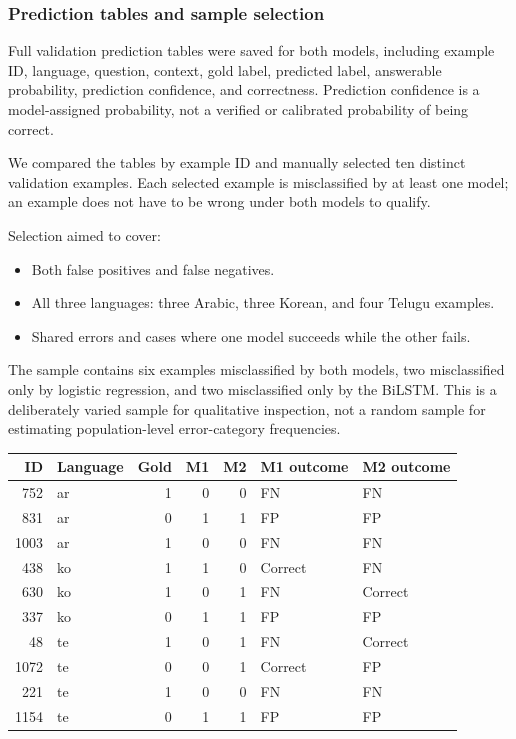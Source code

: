 \documentclass[11pt,a4paper]{article}
\begin{document}
\subsubsection{Prediction tables and sample selection}

Full validation prediction tables were saved for both models,
including example ID, language, question, context, gold label,
predicted label, answerable probability, prediction confidence, and
correctness. Prediction confidence is a model-assigned probability,
not a verified or calibrated probability of being correct.

We compared the tables by example ID and manually selected ten distinct
validation examples. Each selected example is misclassified by at
least one model; an example does not have to be wrong under both
models to qualify.

Selection aimed to cover:
\begin{itemize}
    \item Both false positives and false negatives.
    \item All three languages: three Arabic, three Korean, and four
    Telugu examples.
    \item Shared errors and cases where one model succeeds while
    the other fails.
\end{itemize}

The sample contains six examples misclassified by both models, two
misclassified only by logistic regression, and two misclassified only
by the BiLSTM. This is a deliberately varied sample for qualitative
inspection, not a random sample for estimating population-level
error-category frequencies.

\begin{center}
\small
\begin{tabular}{rlrrrll}
\toprule
ID & Language & Gold & M1 & M2 & M1 outcome & M2 outcome \\
\midrule
752  & ar & 1 & 0 & 0 & FN      & FN \\
831  & ar & 0 & 1 & 1 & FP      & FP \\
1003 & ar & 1 & 0 & 0 & FN      & FN \\
438  & ko & 1 & 1 & 0 & Correct & FN \\
630  & ko & 1 & 0 & 1 & FN      & Correct \\
337  & ko & 0 & 1 & 1 & FP      & FP \\
48   & te & 1 & 0 & 1 & FN      & Correct \\
1072 & te & 0 & 0 & 1 & Correct & FP \\
221  & te & 1 & 0 & 0 & FN      & FN \\
1154 & te & 0 & 1 & 1 & FP      & FP \\
\bottomrule
\end{tabular}
\end{center}
\end{document}
